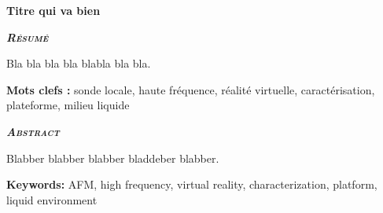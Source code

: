 \thispagestyle{empty}


\noindent \normalsize \textbf{Titre qui va bien}

\noindent \scshape{\textbf{ \slshape Résumé}}

\normalfont \small 
Bla bla bla bla blabla bla bla.

\textbf{Mots clefs : }  sonde locale, haute fréquence, réalité virtuelle, caractérisation,  plateforme, milieu liquide



\vspace{24pt}


\noindent \scshape{\textbf{ \slshape Abstract}}

\normalfont \small 
Blabber blabber blabber bladdeber blabber.

\textbf{Keywords: } AFM, high frequency, virtual reality, characterization, platform, liquid environment

\normalfont \normalsize